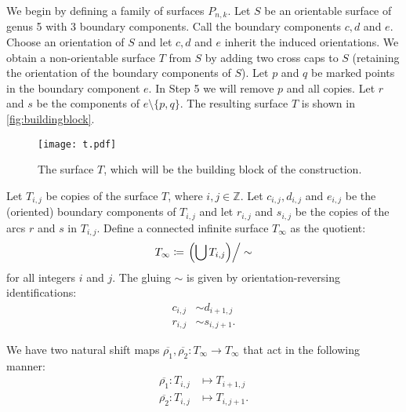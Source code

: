 

We begin by defining a family of surfaces $P_{n,k}$. Let $S$ be an orientable surface of genus 5 with 3
boundary components.  Call the boundary components $c,d$ and $e$. Choose an orientation of $S$ and let $c,d$ and $e$ inherit the induced orientations. We obtain a non-orientable surface $T$ from $S$ by adding two cross caps to $S$ (retaining the orientation of the boundary components of $S$). Let $p$ and $q$ be marked points in the boundary component $e$. In Step 5 we will remove $p$ and all copies.  Let  $r$ and
$s$ be the components of $e\setminus\{p,q\}$. The resulting surface $T$ is shown in \autoref{fig:buildingblock}.

\begin{figure}[ht]
    \centering
    \texttt{[image: t.pdf]}
    \caption{The surface $T$, which will be the building block of the construction.}
    \label{fig:buildingblock}
\end{figure}

Let $T_{i,j}$ be copies of the surface $T$, where $i,j \in \mathbb{Z}$. Let $c_{i,j}, d_{i,j}$ and $e_{i,j}$ be the (oriented) boundary components of $T_{i,j}$ and let $r_{i,j}$ and $s_{i,j}$ be the copies of the arcs $r$ and $s$ in $T_{i,j}$. Define a connected infinite surface $T_\infty$ as the quotient:
\begin{align*}
  T_\infty \coloneqq \left. \left( \bigcup T_{i,j} \right)\right/\sim
\end{align*}
for all integers $i$ and $j$. The gluing $\sim$ is given by orientation-reversing identifications:
\begin{align}
\label{identification}
  c_{i,j} &\sim d_{i+1,j} \\
  r_{i,j} &\sim s_{i,j+1}.
\end{align}


We have two
natural shift maps $\overline{\rho_1},\overline{\rho_2}: T_\infty \to T_\infty$ that act in the
following manner:
\begin{align*}
  \overline{\rho_1}: T_{i,j} &\mapsto T_{i+1, j} \\
  \overline{\rho_2}: T_{i,j} &\mapsto T_{i, j+1}.
\end{align*}

